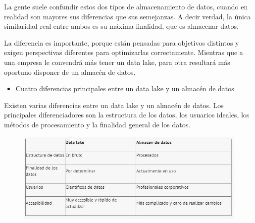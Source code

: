 \documentclass[preprint,12pt]{elsarticle}
\begin{document}
La gente suele confundir estos dos tipos de almacenamiento de datos, cuando en realidad son mayores sus diferencias que sus semejanzas. A decir verdad, la única similaridad real entre ambos es su máxima finalidad, que es almacenar datos.

La diferencia es importante, porque están pensadas para objetivos distintos y exigen perspectivas diferentes para optimizarlas correctamente. Mientras que a una empresa le convendrá más tener un data lake, para otra resultará más oportuno disponer de un almacén de datos.


\begin{itemize}

\item Cuatro diferencias principales entre un data lake y un almacén de datos
\end{itemize}

Existen varias diferencias entre un data lake y un almacén de datos. Los principales diferenciadores son la estructura de los datos, los usuarios ideales, los métodos de procesamiento y la finalidad general de los datos.

\begin{figure}[htb]
				\begin{center}
					\includegraphics[width=15cm]{./IMAGENES/fiorella4}
				\end{center}
			\end{figure}
\end{document}
